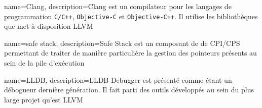 {
	name={Clang},
	description={Clang est un compilateur pour les langages de programmation \texttt{C/C++}, \texttt{Objective-C} et \texttt{Objective-C++}. Il utilise les bibliothèques que met à disposition LLVM}
}

{
	name={safe stack},
	description={Safe Stack est un composant de de CPI/CPS permettant de traiter de manière particulière la gestion des pointeurs présents au sein de la pile d'exécution}
}

{
	name={LLDB},
	description={LLDB Debugger est présenté comme étant un débogueur dernière génération. Il fait parti des outils développés au sein du plus large projet qu'est LLVM}
}





